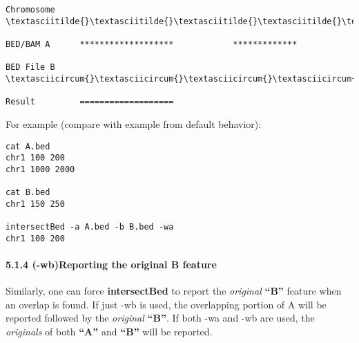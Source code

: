 \documentclass[letterpaper,10pt,english]{sphinxmanual}
\begin{document}
\begin{Verbatim}[commandchars=\\\{\}]
Chromosome  \textasciitilde{}\textasciitilde{}\textasciitilde{}\textasciitilde{}\textasciitilde{}\textasciitilde{}\textasciitilde{}\textasciitilde{}\textasciitilde{}\textasciitilde{}\textasciitilde{}\textasciitilde{}\textasciitilde{}\textasciitilde{}\textasciitilde{}\textasciitilde{}\textasciitilde{}\textasciitilde{}\textasciitilde{}\textasciitilde{}\textasciitilde{}\textasciitilde{}\textasciitilde{}\textasciitilde{}\textasciitilde{}\textasciitilde{}\textasciitilde{}\textasciitilde{}\textasciitilde{}\textasciitilde{}\textasciitilde{}\textasciitilde{}\textasciitilde{}\textasciitilde{}\textasciitilde{}\textasciitilde{}\textasciitilde{}\textasciitilde{}\textasciitilde{}\textasciitilde{}\textasciitilde{}\textasciitilde{}\textasciitilde{}\textasciitilde{}\textasciitilde{}\textasciitilde{}\textasciitilde{}\textasciitilde{}\textasciitilde{}\textasciitilde{}\textasciitilde{}\textasciitilde{}\textasciitilde{}\textasciitilde{}\textasciitilde{}\textasciitilde{}\textasciitilde{}\textasciitilde{}\textasciitilde{}\textasciitilde{}\textasciitilde{}\textasciitilde{}\textasciitilde{}\textasciitilde{}

BED/BAM A      *******************            *************

BED File B                \textasciicircum{}\textasciicircum{}\textasciicircum{}\textasciicircum{}\textasciicircum{}\textasciicircum{}\textasciicircum{}\textasciicircum{}

Result         ===================
\end{Verbatim}

For example (compare with example from default behavior):

\begin{Verbatim}[commandchars=\\\{\}]
cat A.bed
chr1 100 200
chr1 1000 2000

cat B.bed
chr1 150 250

intersectBed -a A.bed -b B.bed -wa
chr1 100 200
\end{Verbatim}


\paragraph{5.1.4 (-wb)Reporting the original B feature}
\label{content/intersectBed:wb-reporting-the-original-b-feature}
Similarly, one can force \textbf{intersectBed} to report the \emph{original} \textbf{``B''} feature when an overlap is found. If
just -wb is used, the overlapping portion of A will be reported followed by the \emph{original} \textbf{``B''}. If both -wa
and -wb are used, the \emph{originals} of both \textbf{``A''} and \textbf{``B''} will be reported.
\end{document}
